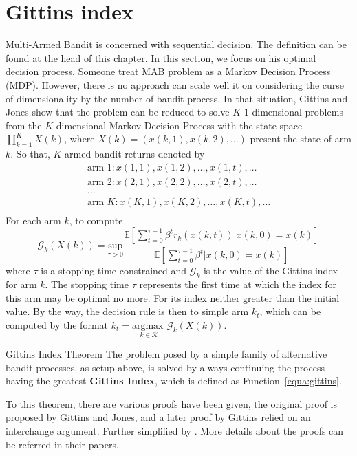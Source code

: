 \section{Gittins index}
\label{sec:gittins}

Multi-Armed Bandit is concerned with sequential decision. The definition can be found at the head of this chapter. In this section, we focus on his optimal decision process.  Someone treat MAB problem as a Markov Decision Process (MDP). However, there is no approach can scale well it on considering the curse of dimensionality by the number of bandit process. In that situation, Gittins and Jones \cite{gittins1974dynamic} show that the problem can be reduced to solve $K$ $1$-dimensional problems from the $K$-dimensional Markov Decision Process  with the state space $\prod_{k=1}^{K}X(k)$, where $X(k) = (x(k,1),x(k,2),\dots)$ present the state of arm $k$. So that, $K$-armed bandit returns denoted by 
\[
\begin{split}
 \text{arm }1: x(1,1),x(1,2),\dots, x(1,t), \dots\\
 \text{arm }2: x(2,1),x(2,2),\dots, x(2,t), \dots \\
\dots \\
 \text{arm }K: x(K,1),x(K,2),\dots, x(K,t), \dots \\
\end{split}
\]
For each arm $k$, to compute
\begin{equation}
\label{equa:gittins}
\mathscr{G}_k(X(k)) = \underset{\tau >0}{\text{sup}} \frac{\mathbb{E}[\sum_{t=0}^{\tau-1}\beta^t r_k(x(k,t))|x(k,0) = x(k)]}{\mathbb{E}[\sum_{t=0}^{\tau-1}\beta^t|x(k,0)=x(k)]}
\end{equation}
where $\tau$ is a stopping time constrained and $\mathscr{G}_k$ is the value of the Gittins index for arm $k$. The stopping time $\tau$ represents the first time at which the index for this arm may be optimal no more. For its index neither greater than the initial value. By the way, the decision rule is then to simple arm $k_t$, which can be computed by the format $k_t = \underset{k\in \mathscr{K}}{\text{argmax }} \mathscr{G}_k(X(k))$. 

\begin{theo}{Gittins Index Theorem}
\label{theo:gittins}
The problem posed by a simple family of alternative bandit processes, as setup above, is solved by always continuing the process having the greatest \textbf{Gittins Index}, which is defined as Function~\ref{equa:gittins}.
\end{theo}
To this theorem, there are various proofs have been given, the original proof is proposed by Gittins and Jones\cite{gittins1974dynamic}, and a later proof by Gittins \cite{gittins1979bandit} relied on an interchange argument. Further simplified by \cite{varaiya1983extension, tsitsiklis1994short}. More details about the proofs can be referred in their papers.

